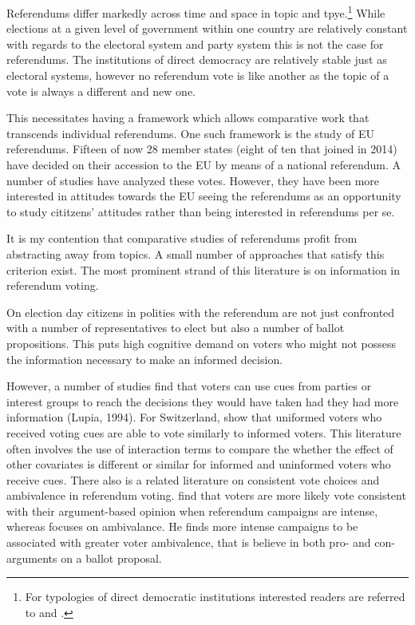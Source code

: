 \documentclass[11pt,a4paper]{article}\usepackage[]{graphicx}\usepackage[]{color}
\begin{document}
    Referendums differ markedly across time and space in topic and tpye.\footnote{For typologies of direct democratic institutions interested readers are referred to \citep{altman_direct_2010} and \citep{hug_occurrence_2004}.} While elections at a given level of government within one country are relatively constant with regards to the electoral system and party system this is not the case for referendums. The institutions of direct democracy are relatively stable just as electoral systems, however no referendum vote is like another as the topic  of a vote is always a different and new one.
    
    This necessitates having a framework which allows comparative work that transcends individual referendums. One such framework is the study of EU referendums. Fifteen of now 28 member states (eight of ten that joined in 2014) have decided on their accession to the EU by means of a national referendum. A number of studies have analyzed these votes. However, they have been more interested in attitudes towards the EU seeing the referendums as an opportunity to study cititzens' attitudes rather than being interested in referendums per se.
    
    It is my contention that comparative studies of referendums profit from abstracting away from topics. A small number of approaches that satisfy this criterion exist. The most prominent strand of this literature is on information in referendum voting.
    
    On election day citizens in polities with the referendum are not just confronted with a number of representatives to elect but also a number of ballot propositions. This puts high cognitive demand on voters who might not possess the information necessary to make an informed decision. 
    
    However, a number of studies find that voters can use cues from parties or interest groups to reach the decisions they would have taken had they had more information (Lupia, 1994). For Switzerland, \citet{christin_interests_2002} show that uniformed voters who received voting cues are able to vote similarly to informed voters. This literature often involves the use of interaction terms to compare the whether the effect of other covariates is different or similar for informed and uninformed voters who receive cues. 
    There also is a related literature on consistent vote choices and ambivalence in referendum voting. \citet{lanz_vote_2014} find that voters are more likely vote consistent with their argument-based opinion when referendum campaigns are intense, whereas  \citet{nai_cadillac_2014} focuses on ambivalance. He finds more intense campaigns to be associated with greater voter ambivalence, that is believe in both pro- and con-arguments on a ballot proposal.
    
\end{document}
